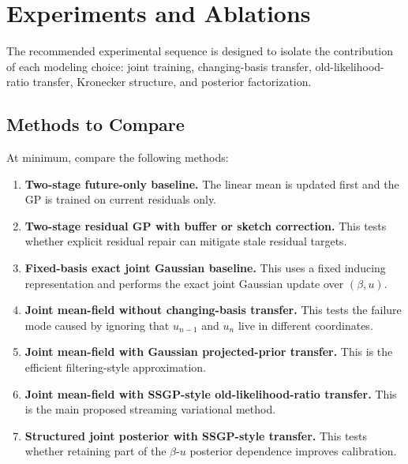 \documentclass[12pt]{article}
\begin{document}
\section{Experiments and Ablations}
\label{sec:experiments_ablations}

The recommended experimental sequence is designed to isolate the contribution of each
modeling choice: joint training, changing-basis transfer, old-likelihood-ratio transfer,
Kronecker structure, and posterior factorization.

\subsection{Methods to Compare}

At minimum, compare the following methods:
\begin{enumerate}[label=(\arabic*)]
    \item \textbf{Two-stage future-only baseline.}
    The linear mean is updated first and the GP is trained on current residuals only.

    \item \textbf{Two-stage residual GP with buffer or sketch correction.}
    This tests whether explicit residual repair can mitigate stale residual targets.

    \item \textbf{Fixed-basis exact joint Gaussian baseline.}
    This uses a fixed inducing representation and performs the exact joint Gaussian
    update over \((\beta,u)\).

    \item \textbf{Joint mean-field without changing-basis transfer.}
    This tests the failure mode caused by ignoring that \(u_{n-1}\) and \(u_n\) live in
    different coordinates.

    \item \textbf{Joint mean-field with Gaussian projected-prior transfer.}
    This is the efficient filtering-style approximation.

    \item \textbf{Joint mean-field with SSGP-style old-likelihood-ratio transfer.}
    This is the main proposed streaming variational method.

    \item \textbf{Structured joint posterior with SSGP-style transfer.}
    This tests whether retaining part of the \(\beta\)-\(u\) posterior dependence improves
    calibration.
\end{enumerate}
\end{document}
